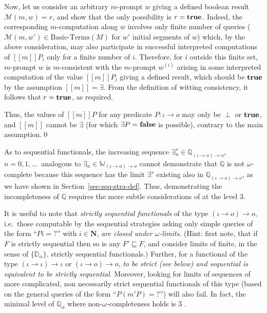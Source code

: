 \documentclass[fleqn]{LMCS}
\theoremstyle{plain}\newtheorem{satz}[thm]{Satz}
\theoremstyle{plain}\newtheorem{hyp}[thm]{Hypothesis}
\theoremstyle{plain}\newtheorem{hyps}[thm]{Hypotheses}
\theoremstyle{definition}\newtheorem{note}[thm]{Note}
\newcommand{\setof}[1]{\{#1\}}
\newcommand{\arr}{\rightarrow}
\newcommand{\Dsem}[1]{[\![ #1 ]\!]}
\newcommand{\NN}{\mathbf{N}}
\newcommand{\bbQ}{\mathbb{Q}}
\newcommand{\tbbW}{\mathbb{W}}\newcommand{\bbD}{\mathbb{D}}
\newcommand{\Undef}{{\perp}}
\newcommand{\MM}{{\mathcal M}}
\newcommand{\?}{\mbox{?}}
\newcommand{\false}{\mbox{\bf false}}
\newcommand{\true}{\mbox{\bf true}}
\begin{document}
Now, let us consider an arbitrary $m$-prompt $w$ giving a defined boolean result 
\linebreak
$\MM(m,w)=r$, and show that the only possibility is $r=\true$.  
Indeed, the corresponding $m$-computation along $w$
involves only finite number of queries 
($\MM(m,w')\in\mbox{Basic-Terms}(M)$ for $w'$ initial segments of $w$)
which, 
by the above consideration, 
may also participate in successful interpreted computations of $\Dsem{m}P_i$ 
only for a finite number of $i$.  Therefore, for $i$ outside this 
finite set, $m$-prompt $w$ 
is $m$-consistent with the $m$-prompt $w^{(i)}$ arising 
in some interpreted computation of the value $\Dsem{m}P_i$ 
giving a defined result, 
which should be $\true$ by the assumption $\Dsem{m}=\exists$. 
From the definition of witting consistency, 
it follows that $r=\true$, as required. 

Thus, the values of 
$\Dsem{m}P$ for any predicate $P:\iota\arr o$ 
may only be $\Undef$ or $\true$, and $\Dsem{m}$ cannot be $\exists$ 
(for which $\exists P=\false$ is possible), contrary to the main assumption.\qed


\bigskip


\noindent
As to sequential functionals, the 
increasing sequence $\exists_n^s\in\bbQ_{(\iota\arr o)\arr o}$, 
$n=0,1,\ldots\,$ analogous to $\exists_n\in\tbbW_{(\iota\arr o)\arr o}$ 
cannot demonstrate that $\bbQ$ is not $\omega$-complete because 
this sequence 
has the limit $\exists^s$ existing also in $\bbQ_{(\iota\arr o)\arr o}$, as we 
have shown in Section~\ref{sec-seq-stra-def}. 
Thus, demonstrating the incompleteness of $\bbQ$ 
requires the more subtle considerations of \cite{Normann2004} at the level 3. 




It is useful to note that \emph{strictly sequential functionals} of
the type $(\iota\arr o)\arr o$, i.e.\ those computable by the
sequential strategies asking only simple queries of the form
``$Pi=\?$'' with $i\in \NN$, \emph{are closed under $\omega$-limits}.
(Hint: first note, that if $F$ is strictly sequential then so is any
$F'\sqsubseteq F$, and consider limits of finite, in the sense of
$\setof{\bbD_\alpha}$, strictly sequential functionals.)  Further, for
a functional of the type $(\iota\arr\iota)\arr\iota$ or $(\iota\arr
o)\arr o$, \emph{to be strict {\em(see below)} and sequential is
equivalent to be strictly sequential}.  Moreover, looking for limits
of sequences of more complicated, non necessarily strict sequential
functionals of this type (based on the general queries of the form
``\mbox{$P(m'P)=\?$}'') will also fail.  In fact, the minimal level of
$\bbQ_\alpha$ where non-$\omega$-completeness holds is 3
\cite{Normann2004}.
\end{document}
